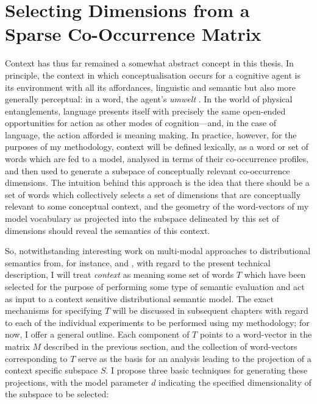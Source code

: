 \section{Selecting Dimensions from a Sparse Co-Occurrence Matrix}
Context has thus far remained a somewhat abstract concept in this thesis.  In principle, the context in which conceptualisation occurs for a cognitive agent is its environment with all its affordances, linguistic and semantic but also more generally perceptual: in a word, the agent's \emph{umwelt} \citep{VonUexkull1957}.  In the world of physical entanglements, language presents itself with precisely the same open-ended opportunities for action as other modes of cognition---and, in the case of language, the action afforded is meaning making.  In practice, however, for the purposes of my methodology, context will be defined lexically, as a word or set of words which are fed to a model, analysed in terms of their co-occurrence profiles, and then used to generate a subspace of conceptually relevant co-occurrence dimensions.  The intuition behind this approach is the idea that there should be a set of words which collectively selects a set of dimensions that are conceptually relevant to some conceptual context, and the geometry of the word-vectors of my model vocabulary as projected into the subspace delineated by this set of dimensions should reveal the semantics of this context.

So, notwithstanding interesting work on multi-modal approaches to distributional semantics from, for instance, \cite{HillEA2014} and \cite{BruniEA2014}, with regard to the present technical description, I will treat \emph{context} as meaning some set of words $T$ which have been selected for the purpose of performing some type of semantic evaluation and act as input to a context sensitive distributional semantic model.  The exact mechanisms for specifying $T$ will be discussed in subsequent chapters with regard to each of the individual experiments to be performed using my methodology; for now, I offer a general outline.  Each component of $T$ points to a word-vector in the matrix $M$ described in the previous section, and the collection of word-vectors corresponding to $T$ serve as the basis for an analysis leading to the projection of a context specific subspace $S$.  I propose three basic techniques for generating these projections, with the model parameter $d$ indicating the specified dimensionality of the subspace to be selected:

